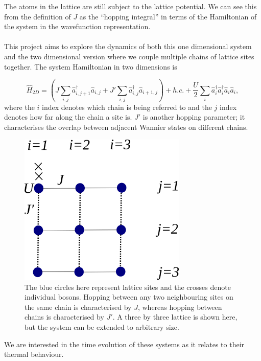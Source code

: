 \documentclass[a4paper,10pt]{article}
\begin{document}
The atoms in the lattice are still subject to the lattice potential. We can see this from the definition of $J$ as the ``hopping integral'' in terms of the Hamiltonian of
the system in the wavefunction representation.
\\\\
This project aims to explore the dynamics of both this one dimensional system and the two dimensional version where we couple multiple chains of lattice sites together. The 
system Hamiltonian in two dimensions is
 
\begin{equation}
\hat{H}_{2D}=(J\sum_{i,j}\hat{a}^\dagger_{i,j+1}\hat{a}_{i,j} + J'\sum_{i,j}\hat{a}^\dagger_{i,j}\hat{a}_{i+1,j})+h.c. +\frac{U}{2}\sum_{i}\hat{a}^\dagger_{i}\hat{a}^\dagger_{i}\hat{a}_{i}\hat{a}_{i},
\end{equation}
where the $i$ index denotes which chain is being referred to and the $j$ index denotes how far along the chain a site is. $J'$ is another hopping parameter; it characterises the 
overlap between adjacent Wannier states on different chains.
\begin{figure}[H]
 \begin{center}
   \includegraphics[width=8cm]{lattice_pic}
 \end{center}
 \caption{The blue circles here represent lattice sites and the crosses denote individual bosons. Hopping between any two neighbouring sites on the same chain is characterised by $J$, whereas hopping 
 between chains is characterised by $J'$. A three by three lattice is shown here, but the system can be extended to arbitrary size.}
 \end{figure}

 
We are interested in the time evolution of these systems as it relates to their thermal behaviour.
\end{document}
